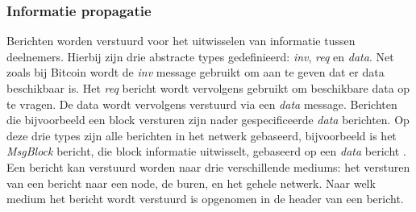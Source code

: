 \subsubsection{Informatie propagatie}
Berichten worden verstuurd voor het uitwisselen van informatie tussen deelnemers. Hierbij zijn drie abstracte types gedefinieerd: \textit{inv}, \textit{req} en \textit{data}. Net zoals bij Bitcoin wordt de \textit{inv} message gebruikt om aan te geven dat er data beschikbaar is. Het \textit{req} bericht wordt vervolgens gebruikt om beschikbare data op te vragen. De data wordt vervolgens verstuurd via een \textit{data} message. Berichten die bijvoorbeeld een block versturen zijn nader gespecificeerde \textit{data} berichten. Op deze drie types zijn alle berichten in het netwerk gebaseerd, bijvoorbeeld is het \textit{MsgBlock} bericht, die block informatie uitwisselt, gebaseerd op een \textit{data} bericht \citep{cardano_wiki:csl_app_level}. Een bericht kan verstuurd worden naar drie verschillende mediums: het versturen van een bericht naar een \gls{node}, de buren, en het gehele netwerk. Naar welk medium het bericht wordt verstuurd is opgenomen in de header van een bericht.

